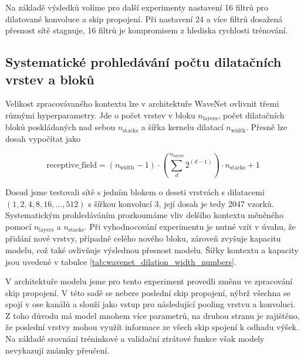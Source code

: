Na základě výsledků volíme pro další experimenty nastavení 16 filtrů pro dilatované konvoluce a skip propojení. Při nastavení 24 a více filtrů dosažená přesnost sítě stagnuje, 16 filtrů je kompromisem z hlediska rychlosti trénování.

\subsection{Systematické prohledávání počtu dilatačních vrstev a bloků}

Velikost zpracovávaného kontextu lze v architektuře WaveNet ovlivnit třemi různými hyperparametry. Jde o počet vrstev v bloku $n_{\mathrm{layers}}$, počet dilatačních bloků poskládaných nad sebou $n_{\mathrm{stacks}}$ a šířka kernelu dilatací $n_{\mathrm{width}}$. Přesně lze dosah vypočítat jako 

    $$\mathrm{receptive\_field} = (n_{\mathrm{width}}-1)\cdot(\sum_d^{n_{\mathrm{layers}}}{2^{(d-1)}})\cdot n_{\mathrm{stacks}}+1$$

Dosud jsme testovali sítě s jedním blokem o deseti vrstvách s dilatacemi $(1,2,4,8,16,\dots,512)$ s šířkou konvolucí 3, její dosah je tedy 2047 vzorků. Systematickým prohledáváním prozkoumáme vliv delšího kontextu měněného pomocí $n_{\mathrm{layers}}$ a $n_{\mathrm{stacks}}$. Při vyhodnocování experimentu je nutné vzít v úvahu, že přidání nové vrstvy, případně celého nového bloku, zároveň zvyšuje kapacitu modelu, což také ovlivňuje výslednou přesnost modelu. Šířky kontextu a kapacity jsou uvedené v tabulce \ref{tab:wavenet_dilation_width_numbers}.

V architektuře modelu jsme pro tento experiment provedli změnu ve zpracování skip propojení. V této sadě se nebere poslední skip propojení, nýbrž všechna se spojí v ose kanálů a slouží jako vstup pro následující pooling vrstvu a konvoluci. Z toho důvodu má model mnohem více parametrů, na druhou stranu je zajištěno, že poslední vrstvy mohou využít informace ze všech skip spojení k odhadu výšek. Na základě srovnání tréninkové a validační ztrátové funkce však modely nevykazují známky přeučení.

